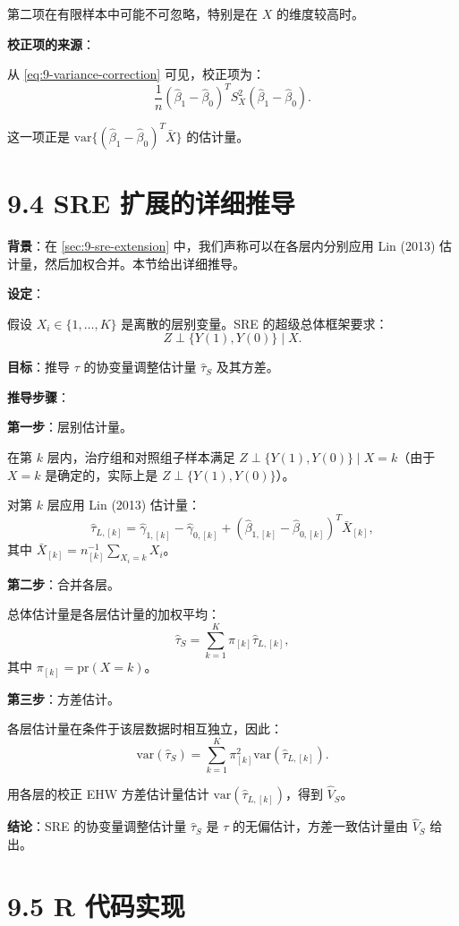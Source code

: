 第二项在有限样本中可能不可忽略，特别是在 $X$ 的维度较高时。

\textbf{校正项的来源}：

从 \cref{eq:9-variance-correction} 可见，校正项为：
\[
\frac{1}{n}(\hat{\beta}_1 - \hat{\beta}_0)^T S_X^2 (\hat{\beta}_1 - \hat{\beta}_0).
\]

这一项正是 $\mathrm{var}\{(\hat{\beta}_1 - \hat{\beta}_0)^T \bar{X}\}$ 的估计量。

\section{9.4 SRE 扩展的详细推导}\label{sec:appendix-9-sre-extension}

\textbf{背景}：在 \cref{sec:9-sre-extension} 中，我们声称可以在各层内分别应用 Lin (2013) 估计量，然后加权合并。本节给出详细推导。

\textbf{设定}：

假设 $X_i \in \{1, \dots, K\}$ 是离散的层别变量。SRE 的超级总体框架要求：
\[
Z \perp \{Y(1), Y(0)\} \mid X.
\]

\textbf{目标}：推导 $\tau$ 的协变量调整估计量 $\hat{\tau}_S$ 及其方差。

\textbf{推导步骤}：

\textbf{第一步}：层别估计量。

在第 $k$ 层内，治疗组和对照组子样本满足 $Z \perp \{Y(1), Y(0)\} \mid X=k$（由于 $X=k$ 是确定的，实际上是 $Z \perp \{Y(1), Y(0)\}$）。

对第 $k$ 层应用 Lin (2013) 估计量：
\[
\hat{\tau}_{L,[k]} = \hat{\gamma}_{1,[k]} - \hat{\gamma}_{0,[k]} + (\hat{\beta}_{1,[k]} - \hat{\beta}_{0,[k]})^T \bar{X}_{[k]},
\]
其中 $\bar{X}_{[k]} = n_{[k]}^{-1}\sum_{X_i=k} X_i$。

\textbf{第二步}：合并各层。

总体估计量是各层估计量的加权平均：
\[
\hat{\tau}_S = \sum_{k=1}^K \pi_{[k]} \hat{\tau}_{L,[k]},
\]
其中 $\pi_{[k]} = \mathrm{pr}(X=k)$。

\textbf{第三步}：方差估计。

各层估计量在条件于该层数据时相互独立，因此：
\[
\mathrm{var}(\hat{\tau}_S) = \sum_{k=1}^K \pi_{[k]}^2 \mathrm{var}(\hat{\tau}_{L,[k]}).
\]

用各层的校正 EHW 方差估计量估计 $\mathrm{var}(\hat{\tau}_{L,[k]})$，得到 $\hat{V}_S$。

\textbf{结论}：SRE 的协变量调整估计量 $\hat{\tau}_S$ 是 $\tau$ 的无偏估计，方差一致估计量由 $\hat{V}_S$ 给出。

\section{9.5 R 代码实现}\label{sec:appendix-9-r-code}

